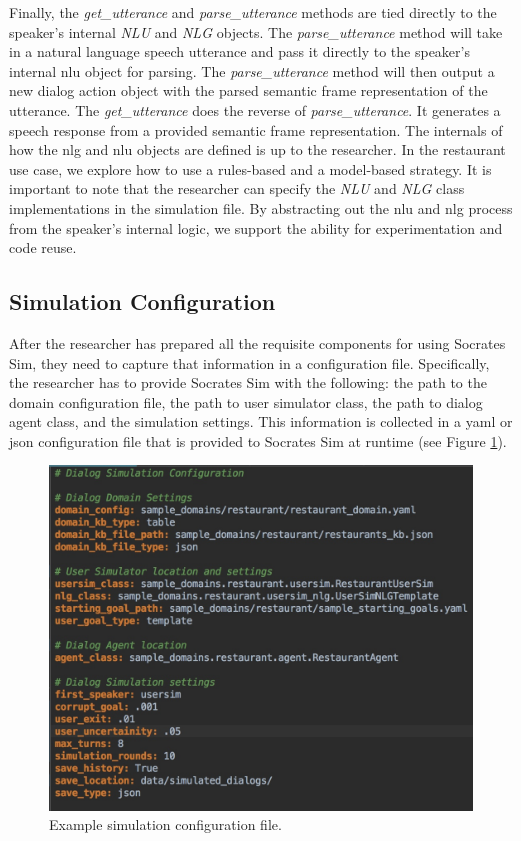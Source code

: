 Finally, the \textit{get\_utterance} and \textit{parse\_utterance} methods are tied directly to the speaker's internal \textit{NLU} and \textit{NLG} objects. The \textit{parse\_utterance} method will take in a natural language speech utterance and pass it directly to the speaker's internal nlu object for parsing. The \textit{parse\_utterance} method will then output a new dialog action object with the parsed semantic frame representation of the utterance. The \textit{get\_utterance} does the reverse of \textit{parse\_utterance}. It generates a speech response from a provided semantic frame representation. The internals of how the nlg and nlu objects are defined is up to the researcher. In the restaurant use case, we explore how to use a rules-based and a model-based strategy. It is important to note that the researcher can specify the \textit{NLU} and \textit{NLG} class implementations in the simulation file. By abstracting out the nlu and nlg process from the speaker's internal logic, we support the ability for experimentation and code reuse. 

\subsection{Simulation Configuration}
After the researcher has prepared all the requisite components for using Socrates Sim, they need to capture that information in a configuration file.  Specifically, the researcher has to provide Socrates Sim with the following: the path to the domain configuration file, the path to user simulator class, the path to dialog agent class, and the simulation settings. This information is collected in a yaml or json configuration file that is provided to Socrates Sim at runtime (see Figure \ref{fig:sample_sim_config}). 

\begin{figure}[h!]
	\centering
	\includegraphics[scale=.25]{diagrams/sample_sim_config.jpeg}
	\caption{ Example simulation configuration file. }
	\label{fig:sample_sim_config}
\end{figure}

